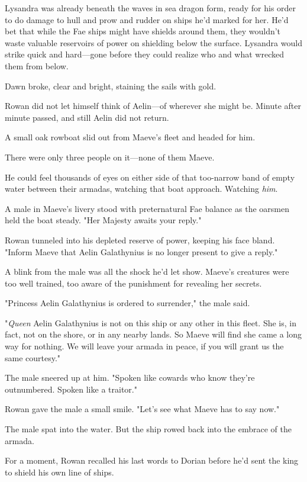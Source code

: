 Lysandra was already beneath the waves in sea dragon form, ready for his order to do damage to hull and prow and rudder on ships he'd marked for her. He'd bet that while the Fae ships might have shields around them, they wouldn't waste valuable reservoirs of power on shielding below the surface. Lysandra would strike quick and hard---gone before they could realize who and what wrecked them from below.

Dawn broke, clear and bright, staining the sails with gold.

Rowan did not let himself think of Aelin---of wherever she might be. Minute after minute passed, and still Aelin did not return.

A small oak rowboat slid out from Maeve's fleet and headed for him.

There were only three people on it---none of them Maeve.

He could feel thousands of eyes on either side of that too-narrow band of empty water between their armadas, watching that boat approach. Watching \emph{him}.

A male in Maeve's livery stood with preternatural Fae balance as the oarsmen held the boat steady. "Her Majesty awaits your reply."

Rowan tunneled into his depleted reserve of power, keeping his face bland. "Inform Maeve that Aelin Galathynius is no longer present to give a reply."

A blink from the male was all the shock he'd let show. Maeve's creatures were too well trained, too aware of the punishment for revealing her secrets.

"Princess Aelin Galathynius is ordered to surrender," the male said.

"\emph{Queen} Aelin Galathynius is not on this ship or any other in this fleet. She is, in fact, not on the shore, or in any nearby lands. So Maeve will find she came a long way for nothing. We will leave your armada in peace, if you will grant us the same courtesy."

The male sneered up at him. "Spoken like cowards who know they're outnumbered. Spoken like a traitor."

Rowan gave the male a small smile. "Let's see what Maeve has to say now."

The male spat into the water. But the ship rowed back into the embrace of the armada.

For a moment, Rowan recalled his last words to Dorian before he'd sent the king to shield his own line of ships.

